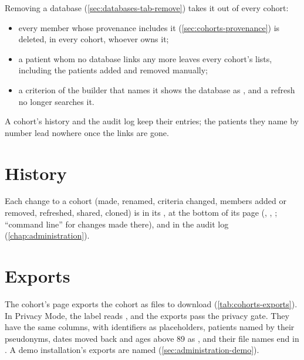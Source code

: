 Removing a database (\cref{sec:databases-tab-remove}) takes it out of every cohort:
\begin{itemize}
\item every member whose provenance includes it (\cref{sec:cohorts-provenance}) is deleted, in
  every cohort, whoever owns it;
\item a patient whom no database links any more leaves every cohort's lists, including the
  patients added and removed manually;
\item a criterion of the builder that names it shows the database as , and a
  refresh no longer searches it.
\end{itemize}
A cohort's history and the audit log keep their entries; the patients they name by number lead
nowhere once the links are gone.

\section{History}
\label{sec:cohorts-history}

Each change to a cohort (made, renamed, criteria changed, members added or removed, refreshed,
shared, cloned) is in its , at the bottom of its page (, ,
; ``command line'' for changes made there), and in the audit log
(\cref{chap:administration}).

\section{Exports}
\label{sec:cohorts-export}

The cohort's page exports the cohort as files to download (\cref{tab:cohorts-exports}). In
Privacy Mode, the label reads , and the exports pass the privacy gate.
They have the same columns, with identifiers as placeholders, patients named by their
pseudonyms, dates moved back and ages above 89 as , and their file names end in
. A demo installation's exports are named 
(\cref{sec:administration-demo}).

